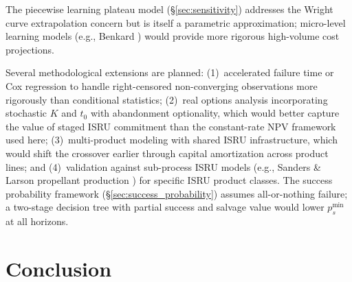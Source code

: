 \documentclass[preprint,12pt]{elsarticle}
\begin{document}
The piecewise learning plateau model (\S\ref{sec:sensitivity}) addresses the Wright curve extrapolation concern but is itself a parametric approximation; micro-level learning models (e.g., Benkard \cite{benkard2000}) would provide more rigorous high-volume cost projections.

Several methodological extensions are planned: (1)~accelerated failure time or Cox regression to handle right-censored non-converging observations more rigorously than conditional statistics; (2)~real options analysis incorporating stochastic $K$ and $t_0$ with abandonment optionality, which would better capture the value of staged ISRU commitment than the constant-rate NPV framework used here; (3)~multi-product modeling with shared ISRU infrastructure, which would shift the crossover earlier through capital amortization across product lines; and (4)~validation against sub-process ISRU models (e.g., Sanders \& Larson propellant production \cite{sanders2015}) for specific ISRU product classes. The success probability framework (\S\ref{sec:success_probability}) assumes all-or-nothing failure; a two-stage decision tree with partial success and salvage value would lower $p_s^{\min}$ at all horizons.

\section{Conclusion}
\label{sec:conclusion}
\end{document}
